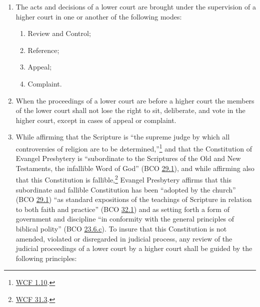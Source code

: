 \documentclass[
]{book}
\providecommand{\tightlist}{%
  \setlength{\itemsep}{0pt}\setlength{\parskip}{0pt}}
\begin{document}
\protect\hypertarget{chapter-slug-42-modes-in-which-the-proceedings-of-lower-courts-come-under-the-supervision-of-higher-courts}{\href{}{}}

\begin{enumerate}
\def\labelenumi{\arabic{enumi}.}
\tightlist
\item
  \protect\hypertarget{42}{\href{}{}}The acts and decisions of a lower court are brought under the supervision of a higher court in one or another of the following modes:

  \begin{enumerate}
  \def\labelenumii{\alph{enumii}.}
  \tightlist
  \item
    Review and Control;
  \item
    Reference;
  \item
    Appeal;
  \item
    Complaint.
  \end{enumerate}
\item
  When the proceedings of a lower court are before a higher court the members of the lower court shall not lose the right to sit, deliberate, and vote in the higher court, except in cases of appeal or complaint.
\item
  While affirming that the Scripture is ``the supreme judge by which all controversies of religion are to be determined,''\footnote{\href{https://evangelpresbytery.com/westminster-confession-of-faith/\#1.10}{WCF 1.10}.} and that the Constitution of Evangel Presbytery is ``subordinate to the Scriptures of the Old and New Testaments, the infallible Word of God'' (BCO \protect\hyperlink{29.1}{29.1}), and while affirming also that this Constitution is fallible,\footnote{\href{https://evangelpresbytery.com/westminster-confession-of-faith/\#31.3}{WCF 31.3}.} Evangel Presbytery affirms that this subordinate and fallible Constitution has been ``adopted by the church'' (BCO \protect\hyperlink{29.1}{29.1}) ``as standard expositions of the teachings of Scripture in relation to both faith and practice'' (BCO \protect\hyperlink{32.1}{32.1}) and as setting forth a form of government and discipline ``in conformity with the general principles of biblical polity'' (BCO \protect\hyperlink{23.6.c}{23.6.c}). To insure that this Constitution is not amended, violated or disregarded in judicial process, any review of the judicial proceedings of a lower court by a higher court shall be guided by the following principles:


\end{enumerate}
\end{document}
